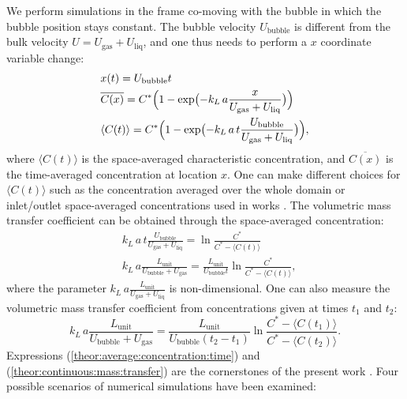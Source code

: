 \documentclass{article}
\newcommand{\beq}{\begin{equation}}
\newcommand{\feq}{\end{equation}}
\newcommand{\beqal}{\begin{equation}\begin{aligned}}
\newcommand{\feqal}{\end{aligned}\end{equation}}
\newcommand{\vol}{k_L\,a}
\newcommand{\lunit}{L_{\mathrm{unit}}}
\newcommand{\ububble}{U_{\mathrm{bubble}}}
\newcommand{\uliq}{U_{\mathrm{liq}}}
\newcommand{\ugas}{U_{\mathrm{gas}}}
\newcommand{\cstar}{C^{*}}
\newcommand{\volnondim}{\vol \frac{\lunit}{\ububble+\ugas}}
\begin{document}
We perform simulations in the frame co-moving with the bubble
in which the bubble position stays constant. The bubble velocity $\ububble$ is
different from the bulk velocity $U=\ugas+\uliq$, and one thus needs to perform a $x$ coordinate
variable change:
\beqal
\label{theor:average:concentration:time}
&x(t)=\ububble t\\
&\overline{C(x)}=\cstar \Bigl(1-\exp\bigl(-\vol \frac{x}{\ugas+\uliq}\bigr)\Bigr)\\
&\langle C(t)\rangle=\cstar \Bigl(1-\exp\bigl(-\vol\, t \frac{\ububble}{\ugas+\uliq}\bigr)\Bigr),
\feqal
where $\langle C(t)\rangle$ is the space-averaged characteristic concentration,
and $\overline{C(x)}$ is the time-averaged concentration at location $x$. 
One can make different choices for
$\langle C(t) \rangle$ such as the concentration averaged over the whole domain or inlet/outlet space-averaged
concentrations used in works \cite{vanbaten-circular,kreutzer-overview}.  
The volumetric mass transfer coefficient can be obtained through the space-averaged concentration:
\beqal
\label{theor:one:concentration:time}
&\vol\, t \frac{\ububble}{\ugas+\uliq}=\ln \frac{\cstar}{\cstar-\langle C(t)\rangle}\\
&\volnondim=\frac{\lunit}{\ububble t}\ln \frac{\cstar}{\cstar-\langle C(t) \rangle},
\feqal
where the parameter $\vol \frac{\lunit}{\ugas+\uliq}$ is non-dimensional. One can also measure the
volumetric mass transfer coefficient from concentrations given at times $t_1$ and $t_2$:
\beq
\label{theor:continuous:mass:transfer}
\volnondim=\frac{\lunit}{\ububble
(t_2-t_1)}\ln\frac{C^{*}-\langle C(t_1) \rangle}{C^{*}-\langle C(t_2) \rangle}.
\feq
Expressions (\ref{theor:average:concentration:time}) and (\ref{theor:continuous:mass:transfer}) are the
cornerstones of the present work . Four possible scenarios of numerical simulations have been examined: 
\end{document}
